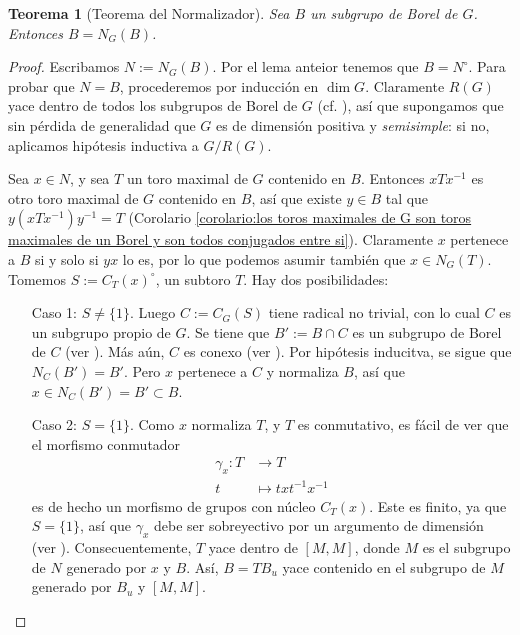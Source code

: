 \documentclass[spanish,10pt]{amsart}
\newtheorem{theorem}{Teorema}[section]
\theoremstyle{definition}
\theoremstyle{remark}
\numberwithin{equation}{section}
\begin{document}
\begin{theorem}[Teorema del Normalizador]\label{teorema:teorema del normalizador}
Sea $B$ un subgrupo de Borel de $G$. Entonces $B = N_G (B)$.
\end{theorem}
\begin{proof}
Escribamos $N := N_G (B)$. Por el lema anteior tenemos que $B = N^\circ$. Para probar que $N = B$, procederemos por inducción en $\dim G$. Claramente $R(G)$ yace dentro de todos los subgrupos de Borel de $G$ (cf. \cite[Ejercicio 21.6]{humphreys2012linearAlgebraicGroups}), así que supongamos que sin pérdida de generalidad que $G$ es de dimensión positiva y \textit{semisimple}: si no, aplicamos hipótesis inductiva a $G/R(G)$.

Sea $x \in N$, y sea $T$ un toro maximal de $G$ contenido en $B$. Entonces $x T x^{-1}$ es otro toro maximal de $G$ contenido en $B$, así que existe $y \in B$ tal que $y( x T x^{-1})y^{-1} = T$ (Corolario \ref{corolario:los toros maximales de G son toros maximales de un Borel y son todos conjugados entre si}). Claramente $x $ pertenece a $B$ si y solo si $yx$ lo es, por lo que podemos asumir también que $x \in N_G (T)$. Tomemos $S := C_T (x)^\circ$, un subtoro $T$. Hay dos posibilidades:
\begin{enumerate}
\item[Caso 1:] $S \neq \{1\}$. Luego $C := C_G (S)$ tiene radical no trivial, con lo cual $C$ es un subgrupo propio de $G$. Se tiene que $B' := B \cap C$ es un subgrupo de Borel de $C$ (ver \cite[\S 22.4.]{humphreys2012linearAlgebraicGroups}). Más aún, $C$ es conexo (ver \cite[Teorema 22.3.]{humphreys2012linearAlgebraicGroups}). Por hipótesis inducitva, se sigue que $N_C (B') = B'$. Pero $x$ pertenece a $C$ y normaliza $B$, así que $x \in N_C (B') = B' \subset B$.
\item[Caso 2:] $S = \{1\}$. Como $x$ normaliza $T$, y $T$ es conmutativo, es fácil de ver que el morfismo conmutador
\begin{align*}
\gamma_x : T &\longrightarrow T \\
t &\longmapsto t x t^{-1}x^{-1}
\end{align*}
es de hecho un morfismo de grupos con núcleo $C_T (x)$. Este es finito, ya que $S = \{1\}$, así que $\gamma_x$ debe ser sobreyectivo por un argumento de dimensión (ver \cite[Proposición 7.4B]{humphreys2012linearAlgebraicGroups}). Consecuentemente, $T$ yace dentro de $[M, M]$, donde $M$ es el subgrupo de $N$ generado por $x$ y $B$. Así, $B = T B_u$ yace contenido en el subgrupo de $M$ generado por $B_u$ y $[M,M]$.


\end{enumerate}
\end{proof}
\end{document}
